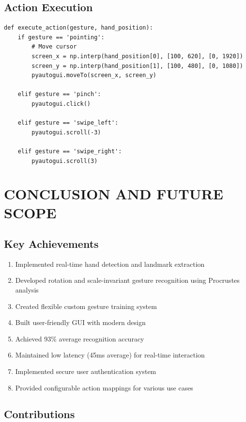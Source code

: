 \documentclass[12pt,a4paper]{report}
\begin{document}
\section{Action Execution}

\begin{lstlisting}[caption={Mouse Control Actions}, label={code:actions}]
def execute_action(gesture, hand_position):
    if gesture == 'pointing':
        # Move cursor
        screen_x = np.interp(hand_position[0], [100, 620], [0, 1920])
        screen_y = np.interp(hand_position[1], [100, 480], [0, 1080])
        pyautogui.moveTo(screen_x, screen_y)
    
    elif gesture == 'pinch':
        pyautogui.click()
    
    elif gesture == 'swipe_left':
        pyautogui.scroll(-3)
    
    elif gesture == 'swipe_right':
        pyautogui.scroll(3)
\end{lstlisting}

\chapter{CONCLUSION AND FUTURE SCOPE}

\section{Key Achievements}

\begin{enumerate}
    \item Implemented real-time hand detection and landmark extraction
    \item Developed rotation and scale-invariant gesture recognition using Procrustes analysis
    \item Created flexible custom gesture training system
    \item Built user-friendly GUI with modern design
    \item Achieved 93\% average recognition accuracy
    \item Maintained low latency (45ms average) for real-time interaction
    \item Implemented secure user authentication system
    \item Provided configurable action mappings for various use cases
\end{enumerate}

\section{Contributions}
\end{document}
